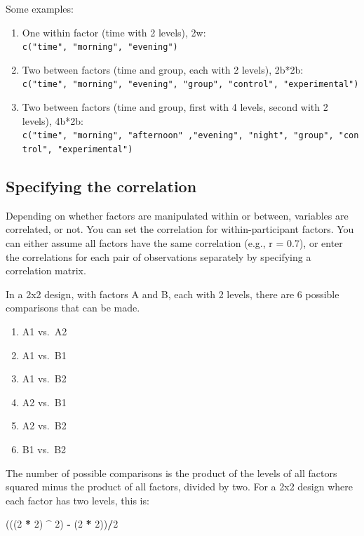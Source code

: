 \documentclass[
]{book}
\newenvironment{Shaded}{\begin{snugshade}}{\end{snugshade}}
\newcommand{\DecValTok}[1]{\textcolor[rgb]{0.00,0.00,0.81}{#1}}
\newcommand{\NormalTok}[1]{#1}
\newcommand{\OperatorTok}[1]{\textcolor[rgb]{0.81,0.36,0.00}{\textbf{#1}}}
\newcommand{\StringTok}[1]{\textcolor[rgb]{0.31,0.60,0.02}{#1}}
\providecommand{\tightlist}{%
  \setlength{\itemsep}{0pt}\setlength{\parskip}{0pt}}
\begin{document}
Some examples:

\begin{enumerate}
\def\labelenumi{\arabic{enumi}.}
\tightlist
\item
  One within factor (time with 2 levels), 2w:
  \texttt{c("time",\ "morning",\ "evening")}
\item
  Two between factors (time and group, each with 2 levels), 2b*2b:
  \texttt{c("time",\ "morning",\ "evening",\ "group",\ "control",\ "experimental")}
\item
  Two between factors (time and group, first with 4 levels, second with 2 levels), 4b*2b:
  \texttt{c("time",\ "morning",\ "afternoon"\ ,"evening",\ "night",\ "group",\ "control",\ "experimental")}
\end{enumerate}

\hypertarget{specifying-the-correlation}{%
\subsection{Specifying the correlation}\label{specifying-the-correlation}}

Depending on whether factors are manipulated within or between, variables are correlated, or not. You can set the correlation for within-participant factors. You can either assume all factors have the same correlation (e.g., r = 0.7), or enter the correlations for each pair of observations separately by specifying a correlation matrix.

In a 2x2 design, with factors A and B, each with 2 levels, there are 6 possible comparisons that can be made.

\begin{enumerate}
\def\labelenumi{\arabic{enumi}.}
\tightlist
\item
  A1 vs.~A2
\item
  A1 vs.~B1
\item
  A1 vs.~B2
\item
  A2 vs.~B1
\item
  A2 vs.~B2
\item
  B1 vs.~B2
\end{enumerate}

The number of possible comparisons is the product of the levels of all factors squared minus the product of all factors, divided by two. For a 2x2 design where each factor has two levels, this is:

\begin{Shaded}
\begin{Highlighting}[]
\NormalTok{(((}\DecValTok{2} \OperatorTok{*}\StringTok{ }\DecValTok{2}\NormalTok{) }\OperatorTok{^}\StringTok{ }\DecValTok{2}\NormalTok{) }\OperatorTok{-}\StringTok{ }\NormalTok{(}\DecValTok{2} \OperatorTok{*}\StringTok{ }\DecValTok{2}\NormalTok{))}\OperatorTok{/}\DecValTok{2}
\end{Highlighting}
\end{Shaded}
\end{document}
